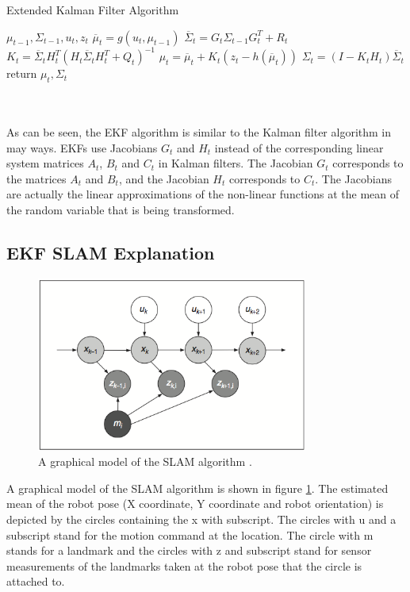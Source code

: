 \documentclass[conference]{IEEEtran}
\begin{document}
\begin{minipage}{\linewidth}
  \begin{algorithm}[H]
    \caption{Extended Kalman Filter Algorithm}\label{AlgEkf}
    \begin{algorithmic}[1]
       {$\mu_{t-1},\Sigma_{t-1}, u_t,z_t$}
	\State $\overline \mu_t = g(u_t, \mu_{t-1})$
	\State $\overline \Sigma_t= G_t \Sigma_{t-1} G_t^T + R_t$  
	\State $K_t = \overline \Sigma_t H_t^T{(H_t \overline \Sigma_t H_t^T + Q_t)}^{-1}$
	\State $\mu_t = \overline \mu_t + K_t(z_t - h(\overline \mu_t))$
	\State $\Sigma_t = (I - K_t H_t) \overline \Sigma_t$
	\State return $\mu_t, \Sigma_t$
      \EndProcedure
    \end{algorithmic}
  \end{algorithm}
\end{minipage}\\\\

As can be seen, the EKF algorithm is similar to the Kalman filter algorithm in may ways. EKFs use Jacobians $G_t$ and $H_t$ instead of the corresponding linear system matrices $A_t$, $B_t$ and $C_t$ in Kalman filters. The Jacobian $G_t$ corresponds to the matrices $A_t$ and $B_t$, and the Jacobian $H_t$ corresponds to $C_t$. The Jacobians are actually the linear approximations of the non-linear functions at the mean of the random variable that is being transformed.
\subsection{EKF SLAM Explanation}
\begin{figure}[!t]
\centering
\includegraphics[width=3.5in]{./figures/GraphicalSlam.png}
\caption{A graphical model of the SLAM algorithm \cite{thrun}.}
\label{GraphicalSlam}
\end{figure}
A graphical model of the SLAM algorithm is shown in figure \ref{GraphicalSlam}. The estimated mean of the robot pose (X coordinate, Y coordinate and robot orientation) is depicted by the circles containing the x with subscript. The circles with u and a subscript stand for the motion command at the location. The circle with m stands for a landmark and the circles with z and subscript stand for sensor measurements of the landmarks taken at the robot pose that the circle is attached to.\\
\end{document}
